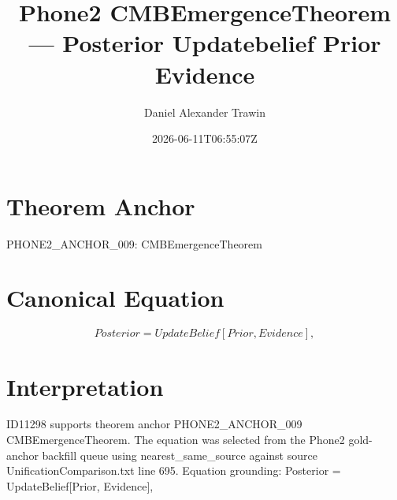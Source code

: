 \documentclass[11pt]{article}
\title{Phone2 CMBEmergenceTheorem — Posterior Updatebelief Prior Evidence}
\author{Daniel Alexander Trawin}
\date{2026-06-11T06:55:07Z}
\begin{document}
\maketitle
\section*{Theorem Anchor}
PHONE2_ANCHOR_009: CMBEmergenceTheorem
\section*{Canonical Equation}
\[
Posterior = UpdateBelief[Prior, Evidence],
\]
\section*{Interpretation}
ID11298 supports theorem anchor PHONE2_ANCHOR_009 CMBEmergenceTheorem. The equation was selected from the Phone2 gold-anchor backfill queue using nearest_same_source against source UnificationComparison.txt line 695. Equation grounding: Posterior = UpdateBelief[Prior, Evidence],
\end{document}
